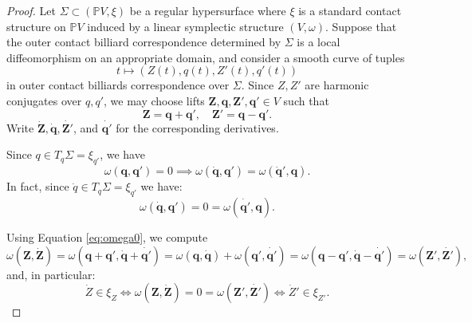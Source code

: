 \documentclass{article}
\begin{document}
\begin{proof}
    Let $\Sigma\subset (\mathbb{P}V, \xi)$ be a regular hypersurface where $\xi$ is a standard 
    contact structure on $\mathbb{P}V$ induced by a linear symplectic structure 
    $(V,\omega)$. Suppose that the outer contact billiard correspondence determined by 
    $\Sigma$ is a local diffeomorphism on an appropriate domain, and consider a smooth 
    curve of tuples
    \[ t\mapsto (Z(t), q(t), Z'(t), q'(t)) \]
    in outer contact billiards correspondence over $\Sigma$. Since $Z,Z'$ are harmonic 
    conjugates over $q, q'$, we may choose lifts $\boldsymbol{Z}, \boldsymbol{q}, 
    \boldsymbol{Z'}, \boldsymbol{q'}\in V$ such that
    \[ \boldsymbol{Z} = \boldsymbol{q} + \boldsymbol{q'}, \quad \boldsymbol{Z'} = \boldsymbol{q} - \boldsymbol{q}'. \]
    Write $\boldsymbol{\dot{Z}}, \boldsymbol{\dot{q}}, \boldsymbol{\dot{Z'}}$, and 
    $\boldsymbol{\dot{q'}}$ for the corresponding derivatives.
    
    Since $q\in T_q\Sigma = \xi_{q'}$, we have
    \[ \omega(\boldsymbol{q}, \boldsymbol{q'}) = 0 \implies \omega(\boldsymbol{\dot{q}}, \boldsymbol{q'}) = \omega(\boldsymbol{\dot{q}'}, \boldsymbol{q}). \]
    In fact, since $\dot q\in T_q\Sigma = \xi_{q'}$ we have:
    \begin{equation}
        \label{eq:omega0}
        \omega(\boldsymbol{\dot{q}}, \boldsymbol{q'}) = 0 = \omega(\boldsymbol{\dot{q'}}, \boldsymbol{q}).
    \end{equation}
    
   Using Equation \ref{eq:omega0}, we compute
    \[ \omega(\boldsymbol{Z},\boldsymbol{\dot{Z}}) = \omega(\boldsymbol{q} + \boldsymbol{q'}, \boldsymbol{\dot{q}} + \boldsymbol{\dot{q'}}) = \omega(\boldsymbol{q}, \boldsymbol{\dot{q}}) + \omega(\boldsymbol{q'},\boldsymbol{\dot{q'}}) = \omega(\boldsymbol{q} - \boldsymbol{q'}, \boldsymbol{\dot{q}} - \boldsymbol{\dot{q'}}) = \omega(\boldsymbol{Z'}, \boldsymbol{\dot{Z'}}), \]
    and, in particular: 
    \[ \dot Z\in \xi_Z \iff \omega(\boldsymbol{Z},\boldsymbol{\dot{Z}}) = 0  = \omega(\boldsymbol{Z'}, \boldsymbol{\dot{Z'}}) \iff \dot Z'\in \xi_{Z'}.\] 
\end{proof}
\end{document}

